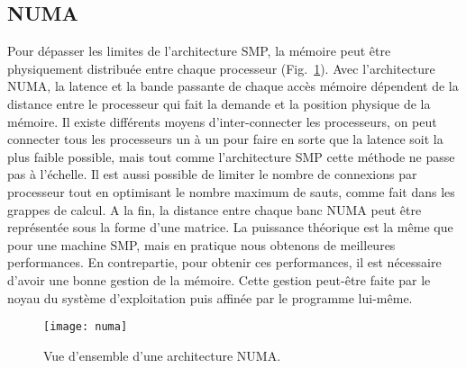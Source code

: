 \subsection{NUMA}
Pour dépasser les limites de l'architecture SMP, la mémoire peut être physiquement distribuée entre chaque processeur (Fig.~\ref{fig:numa}).
%
Avec l'architecture NUMA, la latence et la bande passante de chaque accès mémoire dépendent de la distance entre le processeur qui fait la demande et la position physique de la mémoire.
%
Il existe différents moyens d'inter-connecter les processeurs, on peut connecter tous les processeurs un à un pour faire en sorte que la latence soit la plus faible possible, mais tout comme l'architecture SMP cette méthode ne passe pas à l'échelle.
%
Il est aussi possible de limiter le nombre de connexions par processeur tout en optimisant le nombre maximum de sauts, comme fait dans les grappes de calcul.
%
A la fin, la distance entre chaque banc NUMA peut être représentée sous la forme d'une matrice.
%
La puissance théorique est la même que pour une machine SMP, mais en pratique nous obtenons de meilleures performances.
%
En contrepartie, pour obtenir ces performances, il est nécessaire d'avoir une bonne gestion de la mémoire.
%
Cette gestion peut-être faite par le noyau du système d'exploitation puis affinée par le programme lui-même.

\begin{figure}[!h]
  \centering
  \texttt{[image: numa]}
  \caption{Vue d'ensemble d'une architecture NUMA.}
  \label{fig:numa}
\end{figure}
